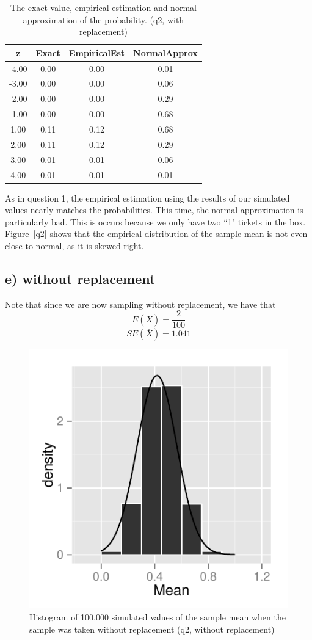 \documentclass[11pt]{article}
\begin{document}
\begin{table}[H]
\centering
\begin{tabular}{|c|ccc|}
  \hline
z & Exact & EmpiricalEst & NormalApprox \\ 
  \hline
-4.00 & 0.00 & 0.00 & 0.01 \\ 
  -3.00 & 0.00 & 0.00 & 0.06 \\ 
  -2.00 & 0.00 & 0.00 & 0.29 \\ 
  -1.00 & 0.00 & 0.00 & 0.68 \\ 
  1.00 & 0.11 & 0.12 & 0.68 \\ 
  2.00 & 0.11 & 0.12 & 0.29 \\ 
  3.00 & 0.01 & 0.01 & 0.06 \\ 
  4.00 & 0.01 & 0.01 & 0.01 \\ 
   \hline
\end{tabular}
\caption{The exact value, empirical estimation and normal approximation of the probability. (q2, with replacement)} 
\end{table}

\noindent As in question 1, the empirical estimation using the results of our simulated values nearly matches the probabilities. This time, the normal approximation is particularly bad. This is occurs because we only have two ``1" tickets in the box.  Figure~\ref{q2} shows that the empirical distribution of the sample mean is not even close to normal, as it is skewed right.  


\subsection*{e) without replacement}


\noindent Note that since we are now sampling without replacement, we have that
$$E(\bar{X})= \frac{2}{100}$$ 
$$SE(\bar{X}) = 1.041$$


\begin{figure}
\centering
\includegraphics[scale=1]{histogram_1e-1.pdf}
\caption{Histogram of 100,000 simulated values of the sample mean when the sample was taken without replacement (q2, without replacement)}
\end{figure}
\end{document}
